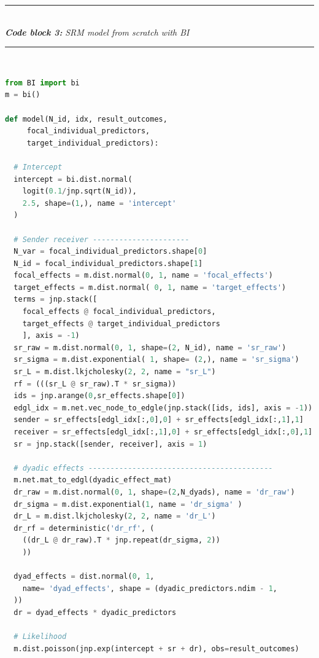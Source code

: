 \documentclass[num-refs]{wiley-article}
\begin{document}
\label{code:block3_example} 
\noindent\rule{\linewidth}{0.4pt}\\[0pt] %
\noindent\textbf{\textit{Code block 3: }} \textit{SRM model from scratch with BI}\\[-10pt]
\noindent\rule{\linewidth}{0.4pt}\\[-8pt] %
\vspace{-\parskip}\vspace{0pt}

\begin{lstlisting}[language=Python, label=lst:srm_scratch]
from BI import bi
m = bi()

def model(N_id, idx, result_outcomes,
     focal_individual_predictors, 
     target_individual_predictors):

  # Intercept 
  intercept = bi.dist.normal(
    logit(0.1/jnp.sqrt(N_id)), 
    2.5, shape=(1,), name = 'intercept'
  )

  # Sender receiver ----------------------
  N_var = focal_individual_predictors.shape[0]
  N_id = focal_individual_predictors.shape[1]  
  focal_effects = m.dist.normal(0, 1, name = 'focal_effects')
  target_effects = m.dist.normal( 0, 1, name = 'target_effects')
  terms = jnp.stack([
    focal_effects @ focal_individual_predictors,
    target_effects @ target_individual_predictors
    ], axis = -1)
  sr_raw = m.dist.normal(0, 1, shape=(2, N_id), name = 'sr_raw')
  sr_sigma = m.dist.exponential( 1, shape= (2,), name = 'sr_sigma')
  sr_L = m.dist.lkjcholesky(2, 2, name = "sr_L")
  rf = (((sr_L @ sr_raw).T * sr_sigma))
  ids = jnp.arange(0,sr_effects.shape[0])
  edgl_idx = m.net.vec_node_to_edgle(jnp.stack([ids, ids], axis = -1))
  sender = sr_effects[edgl_idx[:,0],0] + sr_effects[edgl_idx[:,1],1]
  receiver = sr_effects[edgl_idx[:,1],0] + sr_effects[edgl_idx[:,0],1]
  sr = jnp.stack([sender, receiver], axis = 1)

  # dyadic effects ------------------------------------------
  m.net.mat_to_edgl(dyadic_effect_mat)
  dr_raw = m.dist.normal(0, 1, shape=(2,N_dyads), name = 'dr_raw')
  dr_sigma = m.dist.exponential(1, name = 'dr_sigma' )
  dr_L = m.dist.lkjcholesky(2, 2, name = 'dr_L')
  dr_rf = deterministic('dr_rf', (
    ((dr_L @ dr_raw).T * jnp.repeat(dr_sigma, 2))
    ))

  dyad_effects = dist.normal(0, 1, 
    name= 'dyad_effects', shape = (dyadic_predictors.ndim - 1,
  ))
  dr = dyad_effects * dyadic_predictors

  # Likelihood                            
  m.dist.poisson(jnp.exp(intercept + sr + dr), obs=result_outcomes) 
\end{lstlisting}
\end{document}
